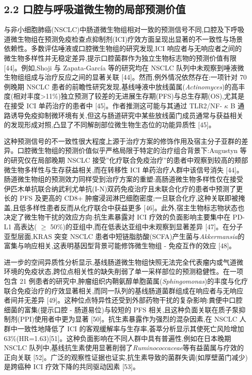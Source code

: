 \documentclass[11pt]{article}
\begin{document}
\subsection{2.2 口腔与呼吸道微生物的局部预测价值}\label{ux53e3ux8154ux4e0eux547cux5438ux9053ux5faeux751fux7269ux7684ux5c40ux90e8ux9884ux6d4bux4ef7ux503c}

与非小细胞肺癌(NSCLC)中肠道微生物组相对一致的预测信号不同,口腔及下呼吸道微生物组在预测免疫检查点抑制剂(ICI)疗效方面呈现出显著的不一致性与场景依赖性。多数评估唾液或口腔微生物组的研究发现,ICI 响应者与无响应者之间的微生物多样性并无稳定差异,提示口腔菌群作为独立生物标志物的预测价值有限 {[}44{]}。例如,Shoji 与 Zapata-García 等的研究均在 NSCLC 队列中未观察到唾液微生物组组成与治疗反应之间的显著关联 {[}44{]}。然而,例外情况依然存在:一项针对 70 例晚期 NSCLC 患者的前瞻性研究发现,基线唾液中放线菌属(\emph{Actinomyces})的高丰度(相对丰度\textgreater11\%)独立预测了较差的无进展生存期(PFS)与总生存期(OS),尤其是在接受 ICI 单药治疗的患者中 {[}45{]}。作者推测这可能与其通过 TLR2/NF- \(\kappa\) B 通路诱导免疫抑制微环境有关,但这与肠道研究中某些放线菌门成员通常与获益相关的发现形成对照,凸显了不同解剖部位微生物生态位的功能异质性 {[}45{]}。

这种预测信号的不一致性很大程度上源于治疗方案的修饰作用及宿主分子亚群的差异。口腔微生物组的预测价值似乎严格局限于特定的治疗组合背景下:Augustyn 等的研究仅在局部晚期 NSCLC 接受''化疗联合免疫治疗''的患者中观察到较高的颊部微生物多样性与生存获益相关,而在转移性 ICI 单药治疗人群中该信号消失 {[}44{]}。肠道微生物组的预测效力同样受到治疗方案的重塑:高肠道微生物多样性仅在接受伊匹木单抗联合纳武利尤单抗(I-N)双药免疫治疗且未联合化疗的患者中预测了更长的 PFS 及更高的 CD8+ 肿瘤浸润淋巴细胞密度;一旦联合化疗,这种关联即被掩盖,且低多样性患者反而从化疗联合中获益更多 {[}46{]}。此外,宿主生物标志物状态也决定了微生物干扰的效应方向:抗生素暴露对 ICI 疗效的负面影响主要集中在 PD-L1 高表达( \(\geq\) 50\%)的亚组中,而在低表达亚组中未观察到显著差异 {[}47{]}。在分子亚型层面,KRAS 突变 NSCLC 患者中短链脂肪酸(SCFA)产生菌与\emph{Akkermansia}的富集与响应相关,这表明基因型背景可能修饰微生物组 - 免疫互作的效应 {[}48{]}。

进一步的空间异质性分析显示,基线肠道微生物组快照无法完全代表瘤内或气道微环境的免疫状态,跨位点相关性的缺失削弱了单一采样部位的预测稳健性。在一项包含 21 例患者的研究中,肿瘤组织内鞘氨醇单胞菌属(\emph{Sphingomonas})的丰度与化疗联合免疫治疗的疗效显著相关,而同一队列的基线肠道菌群组成在响应者与无响应者间并无差异 {[}49{]}。这种位点特异性还受到外部药物干扰的复杂影响:粪便中口腔细菌的富集(提示口腔 - 肠道易位)与较短的 PFS 相关,且这种负面关联在质子泵抑制剂(PPI)使用者中更为显著 {[}50{]}。抗生素暴露作为强烈的混杂因素,在 NSCLC 人群中一致性地降低了 ICI 的客观缓解率与生存率,荟萃分析显示其使死亡风险增加 63\%(HR=1.63){[}51{]}。这种负面影响在不同人群中具有普遍性,例如在日本晚期 NSCLC 队列中,基线抗生素使用显著削弱了\emph{Ruminococcaceae}等有益菌属与疗效的正向关联 {[}52{]}。广泛的观察性证据也证实,抗生素导致的菌群失调(如厚壁菌门减少)是跨癌种 ICI 疗效下降的共同驱动因素 {[}53{]}。
\end{document}
